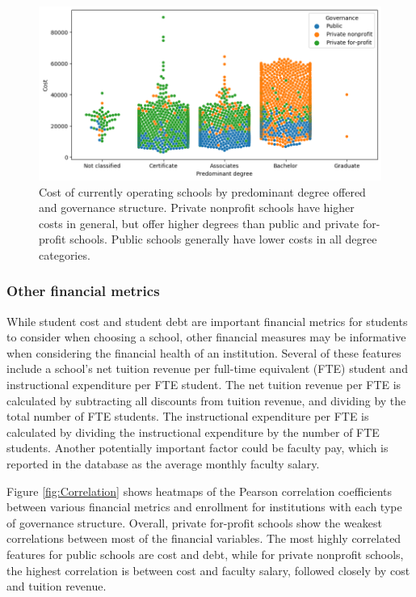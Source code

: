 \documentclass[11pt, letterpaper]{article}
\begin{document}
\begin{figure}[h]
\begin{center}
\includegraphics[width=6in]{currentPriceDegreeSwarm.png}
\caption{Cost of currently operating schools by predominant degree offered and governance structure. Private nonprofit schools have higher costs in general, but offer higher degrees than public and private for-profit schools. Public schools generally have lower costs in all degree categories.} 
\label{fig:CostDegree}
\end{center}
\end{figure}

\subsubsection{Other financial metrics}
While student cost and student debt are important financial metrics for students to consider when choosing a school, other financial measures may be informative when considering the financial health of an institution. Several of these features include a school's net tuition revenue per full-time equivalent (FTE) student and instructional expenditure per FTE student. The net tuition revenue per FTE is calculated by subtracting all discounts from tuition revenue, and dividing by the total number of FTE students. The instructional expenditure per FTE is calculated by dividing the instructional expenditure by the number of FTE students. Another potentially important factor could be faculty pay, which is reported in the database as the average monthly faculty salary.

Figure \ref{fig:Correlation} shows heatmaps of the Pearson correlation coefficients between various financial metrics and enrollment for institutions with each type of governance structure. Overall, private for-profit schools show the weakest correlations between most of the financial variables. The most highly correlated features for public schools are cost and debt, while for private nonprofit schools, the highest correlation is between cost and faculty salary, followed closely by cost and tuition revenue.
\end{document}

